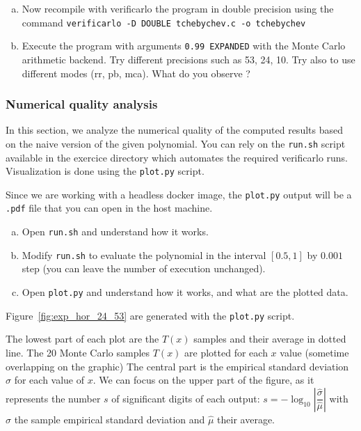 \begin{question}
  \begin{enumerate}[(a)]
  \item Now recompile with verificarlo the program in double precision using the command
    {\tt verificarlo -D DOUBLE tchebychev.c -o tchebychev} \\
  \item Execute the program with arguments \texttt{0.99 EXPANDED} with the Monte Carlo arithmetic backend. Try different precisions such as 53, 24, 10. Try also to use different modes (rr, pb, mca). What do you observe ?
  \end{enumerate}
\end{question}

\subsubsection{Numerical quality analysis}

In this section, we analyze the numerical quality of the computed results based on the naive version of the given polynomial. 
You can rely on the \texttt{run.sh} script available in the exercice directory which automates the required verificarlo runs. 
Visualization is done using the \texttt{plot.py} script.

Since we are working with a headless docker image, the \texttt{plot.py} output
will be a \texttt{.pdf} file that you can open in the host machine.


\begin{question}
  \begin{enumerate}[(a)]
 \item Open {\tt run.sh} and understand how it works.
  \item Modify {\tt run.sh} to evaluate the polynomial in the interval $[0.5,1]$ by $0.001$ step (you can leave the number of execution unchanged).
  \item Open {\tt plot.py} and understand how it works, and what are the plotted data.
  \end{enumerate}
\end{question}

Figure~\ref{fig:exp_hor_24_53} are generated with the \texttt{plot.py} script.

The lowest part of each plot are the $T(x)$ samples and their average in dotted line. The 20 Monte Carlo samples $T(x)$ are plotted for each $x$ value (sometime overlapping on the graphic)
The central part is the empirical standard deviation $\hat\sigma$ for each value of $x$.
We can focus on the upper part of the figure, as it represents the number $s$ of significant digits of each output: $s=-\log_{10}\left|\dfrac{\hat\sigma}{\hat\mu}\right|$ with $\hat\sigma$ the sample empirical standard deviation and $\hat\mu$ their average.

